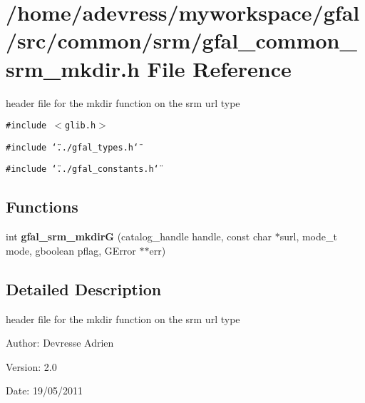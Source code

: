 \section{/home/adevress/myworkspace/gfal/src/common/srm/gfal\_\-common\_\-srm\_\-mkdir.h File Reference}
\label{gfal__common__srm__mkdir_8h}
header file for the mkdir function on the srm url type 

{\tt \#include $<$glib.h$>$}\par
{\tt \#include \char`\"{}../gfal\_\-types.h\char`\"{}}\par
{\tt \#include \char`\"{}../gfal\_\-constants.h\char`\"{}}\par
\subsection*{Functions}
\begin{CompactItemize}
\item 
int \textbf{gfal\_\-srm\_\-mkdir\-G} (catalog\_\-handle handle, const char $\ast$surl, mode\_\-t mode, gboolean pflag, GError $\ast$$\ast$err)\label{gfal__common__srm__mkdir_8h_4e66d8088eeabd271fbb3a6d1b56d09f}

\end{CompactItemize}


\subsection{Detailed Description}
header file for the mkdir function on the srm url type 

\begin{Desc}
\item[Author:]Devresse Adrien \end{Desc}
\begin{Desc}
\item[Version:]2.0 \end{Desc}
\begin{Desc}
\item[Date:]19/05/2011 \end{Desc}
